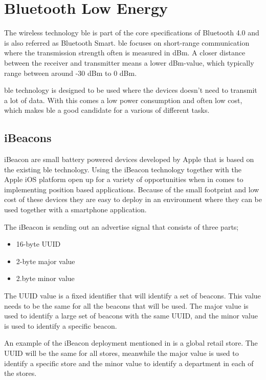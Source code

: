 \section{Bluetooth Low Energy}\label{sec:theoryBle}
The wireless technology \acrfull{ble} is part of the core specifications of Bluetooth 4.0 and is also referred as Bluetooth Smart.
\acrshort{ble} focuses on short-range communication where the transmission strength often is measured in dBm.
A closer distance between the receiver and transmitter means a lower dBm-value, which typically range between around -30 dBm to 0 dBm.
\cite{DevelopmentMobileIndoor2017} 

\bigskip

\acrshort{ble} technology is designed to be used where the devices doesn't need to transmit a lot of data.
With this comes a low power consumption and often low cost, which makes \acrshort{ble} a good candidate for a various of different tasks.
\cite{PracticalFingerprintingLocalization2017} 


\subsection{iBeacons}\label{sec:theoryBleiBeacons}
iBeacon are small battery powered devices developed by Apple that is based on the existing \acrshort{ble} technology.
Using the iBeacon technology together with the Apple iOS platform open up for a variety of opportunities when in comes to implementing position based applications.
Because of the small footprint and low cost of these devices they are easy to deploy in an environment where they can be used together with a smartphone application.
\cite{BluetoothLowEnergy2018} 

\bigskip

The iBeacon is sending out an advertise signal that consists of three parts;
\begin{itemize}
\item 16-byte UUID
\item 2-byte major value
\item 2.byte minor value \cite{GettingStartedIBeacon2014} 
\end{itemize}

The UUID value is a fixed identifier that will identify a set of beacons.
This value needs to be the same for all the beacons that will be used.
The major value is used to identify a large set of beacons with the same UUID, and the minor value is used to identify a specific beacon.
\cite{GettingStartedIBeacon2014}

\bigskip

An example of the iBeacon deployment mentioned in \cite{GettingStartedIBeacon2014} is a global retail store. The UUID will be the same for all stores, meanwhile the major value is used to identify a specific store and the minor value to identify a department in each of the stores.
\cite{GettingStartedIBeacon2014} 

